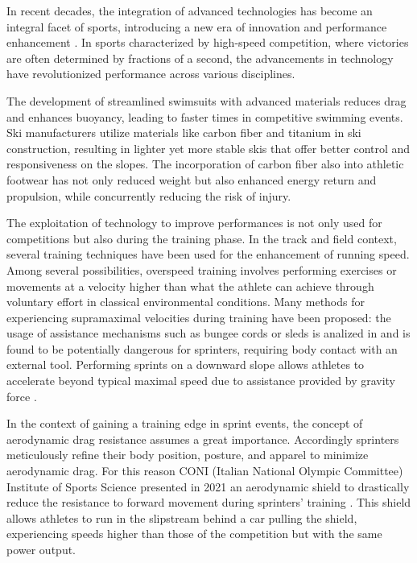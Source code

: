 \documentclass[a4paper,12pt,oneside]{book}
\begin{document}
In recent decades, the integration of advanced technologies has become an integral facet of sports, introducing a new era of innovation and performance enhancement \cite{Technology_athletics}. 
In sports characterized by high-speed competition, where victories are often determined by fractions of a second, the advancements in technology have revolutionized performance across various disciplines. 
\bigskip

The development of streamlined swimsuits with advanced materials reduces drag and enhances buoyancy, leading to faster times in competitive swimming events.
Ski manufacturers utilize materials like carbon fiber and titanium in ski construction, resulting in lighter yet more stable skis that offer better control and responsiveness on the slopes.
The incorporation of carbon fiber also into athletic footwear has not only reduced weight but also enhanced energy return and propulsion, while concurrently reducing the risk of injury.
\bigskip

The exploitation of technology to improve performances is not only used for competitions but also during the training phase. 
In the track and field context, several training techniques have been used for the enhancement of running speed. 
Among several possibilities, overspeed training involves performing exercises or movements at a velocity higher than what the athlete can achieve through voluntary effort in classical environmental conditions. 
Many methods for experiencing supramaximal velocities during training have been proposed: the usage of assistance mechanisms such as bungee cords or sleds is analized in \cite{Elastic_cord} and is found to be potentially dangerous for sprinters, requiring body contact with an external tool.
Performing sprints on a downward slope allows athletes to accelerate beyond typical maximal speed due to assistance provided by gravity force \cite{Hill_slope}.
\bigskip

In the context of gaining a training edge in sprint events, the concept of aerodynamic drag resistance assumes a great importance. 
Accordingly sprinters meticulously refine their body position, posture, and apparel to minimize aerodynamic drag. 
For this reason CONI (Italian National Olympic Committee) Institute of Sports Science presented in 2021 an aerodynamic shield to drastically reduce the resistance to forward movement during sprinters' training \cite{Coni_article}. 
This shield allows athletes to run in the slipstream behind a car pulling the shield, experiencing speeds higher than those of the competition but with the same power output. 
\bigskip
\end{document}
